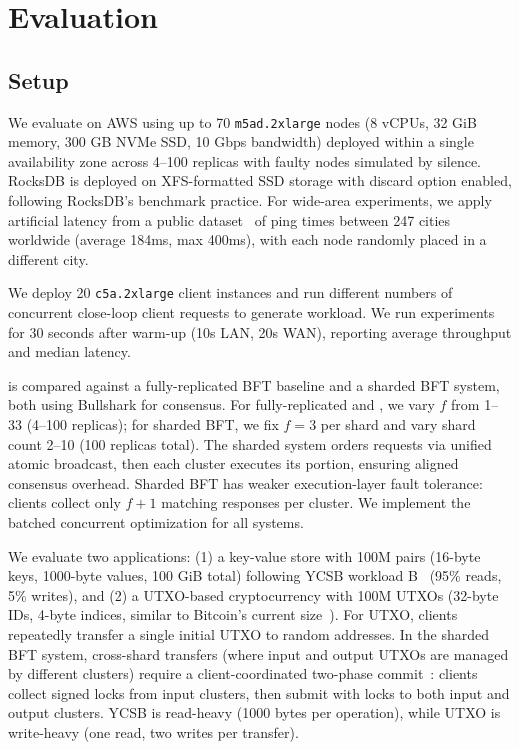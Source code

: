 \section{Evaluation}
\label{sec:eval}

\subsection{Setup}

We evaluate \sys on AWS using up to 70 \texttt{m5ad.2xlarge} nodes (8 vCPUs, 32 GiB memory, 300 GB NVMe SSD, 10 Gbps bandwidth) deployed within a single availability zone across 4--100 replicas with faulty nodes simulated by silence.
RocksDB is deployed on XFS-formatted SSD storage with discard option enabled, following RocksDB's benchmark practice.
For wide-area experiments, we apply artificial latency from a public dataset~\cite{Reinheimer2020} of ping times between 247 cities worldwide (average 184ms, max 400ms), with each node randomly placed in a different city.

We deploy 20 \texttt{c5a.2xlarge} client instances and run different numbers of concurrent close-loop client requests to generate workload.
We run experiments for 30 seconds after warm-up (10s LAN, 20s WAN), reporting average throughput and median latency.

\sys is compared against a fully-replicated BFT baseline and a sharded BFT system, both using Bullshark for consensus.
For fully-replicated and \sys, we vary $f$ from 1--33 (4--100 replicas); for sharded BFT, we fix $f=3$ per shard and vary shard count 2--10 (100 replicas total).
The sharded system orders requests via unified atomic broadcast, then each cluster executes its portion, ensuring aligned consensus overhead.
Sharded BFT has weaker execution-layer fault tolerance: clients collect only $f+1$ matching responses per cluster.
We implement the batched concurrent \fetch optimization for all systems.

We evaluate two applications: (1) a key-value store with 100M pairs (16-byte keys, 1000-byte values, 100 GiB total) following YCSB workload B~\cite{cooper2010benchmarking} (95\% reads, 5\% writes), and (2) a UTXO-based cryptocurrency with 100M UTXOs (32-byte IDs, 4-byte indices, similar to Bitcoin's current size~\cite{MempoolUTXOReport2025}).
For UTXO, clients repeatedly transfer a single initial UTXO to random addresses.
In the sharded BFT system, cross-shard transfers (where input and output UTXOs are managed by different clusters) require a client-coordinated two-phase commit~\cite{kokoris2018omniledger}: clients collect signed locks from input clusters, then submit with locks to both input and output clusters.
YCSB is read-heavy (1000 bytes per operation), while UTXO is write-heavy (one read, two writes per transfer).


